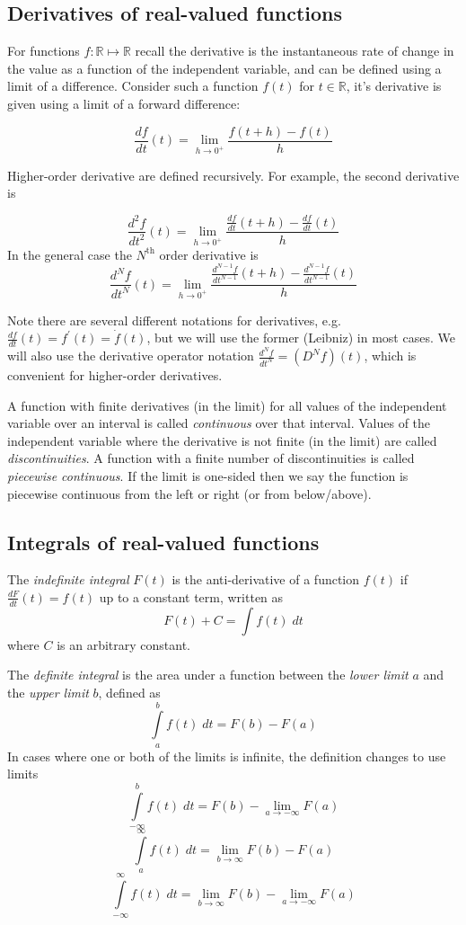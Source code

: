 \subsection*{Derivatives of real-valued functions}

For functions $f:\mathbb{R}\mapsto\mathbb{R}$ recall the derivative is the instantaneous rate of change in the value as a function of the independent variable, and can be defined using a limit of a difference. Consider such a function $f(t)$ for $t\in\mathbb{R}$, it's derivative is given using a limit of a forward difference:

\[
\frac{df}{dt} (t) = \lim_{h\rightarrow0^+} \frac{f(t+h)-f(t)}{h}
\]

Higher-order derivative are defined recursively. For example, the second derivative is

\[
\frac{d^2f}{dt^2} (t) = \lim_{h\rightarrow0^+} \frac{\frac{df}{dt}(t+h)-\frac{df}{dt}(t)}{h}
\]
In the general case the $N^\text{th}$ order derivative is
\[
\frac{d^Nf}{dt^N} (t) = \lim_{h\rightarrow0^+} \frac{\frac{d^{N-1}f}{dt^{N-1}}(t+h)-\frac{d^{N-1}f}{dt^{N-1}}(t)}{h}
\]

Note there are several different notations for derivatives, e.g. $\frac{df}{dt}(t) = f^\prime (t) = \dot{f}(t)$, but we will use the former (Leibniz) in most cases. We will also use the derivative operator notation $\frac{d^Nf}{dt^N} = (D^N f)(t)$, which is convenient for higher-order derivatives.

A function with finite derivatives (in the limit) for all values of the independent variable over an interval is called \textit{continuous} over that interval. Values of the independent variable where the derivative is not finite (in the limit) are called \textit{discontinuities}. A function with a finite number of discontinuities is called \textit{piecewise continuous}. If the limit is one-sided then we say the function is piecewise continuous from the left or right (or from below/above).

\subsection*{Integrals of real-valued functions}

The \textit{indefinite integral} $F(t)$ is the anti-derivative of a function $f(t)$ if $\frac{dF}{dt}(t) = f(t)$ up to a constant term, written as
\[
F(t) + C = \int f(t)\; dt
\]
where $C$ is an arbitrary constant.

The \textit{definite integral} is the area under a function between the \textit{lower limit} $a$ and the \textit{upper limit} $b$, defined as
\[
\int\limits_{a}^{b} f(t) \; dt = F(b) - F(a)
\]
In cases where one or both of the limits is infinite, the definition changes to use limits
\[
\int\limits_{-\infty}^{b} f(t) \; dt = F(b) - \lim_{a\rightarrow -\infty} F(a)
\]
\[
\int\limits_{a}^{\infty} f(t) \; dt = \lim_{b\rightarrow \infty} F(b) - F(a)
\]
\[
\int\limits_{-\infty}^{\infty} f(t) \; dt = \lim_{b\rightarrow \infty} F(b) - \lim_{a\rightarrow -\infty} F(a)
\]

